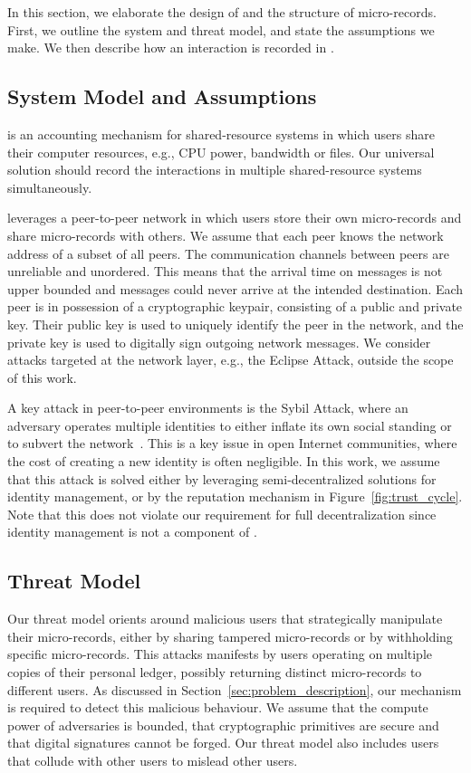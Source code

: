 In this section, we elaborate the design of \ModelName{} and the structure of micro-records.
First, we outline the system and threat model, and state the assumptions we make.
We then describe how an interaction is recorded in \ModelName{}.

\subsection{System Model and Assumptions}
\ModelName{} is an accounting mechanism for shared-resource systems in which users share their computer resources, e.g., CPU power, bandwidth or files.
Our universal solution should record the interactions in multiple shared-resource systems simultaneously.

\ModelName{} leverages a peer-to-peer network in which users store their own micro-records and share micro-records with others.
We assume that each peer knows the network address of a subset of all peers.
The communication channels between peers are unreliable and unordered.
This means that the arrival time on messages is not upper bounded and messages could never arrive at the intended destination.
Each peer is in possession of a cryptographic keypair, consisting of a public and private key.
Their public key is used to uniquely identify the peer in the network, and the private key is used to digitally sign outgoing network messages.
We consider attacks targeted at the network layer, e.g., the Eclipse Attack, outside the scope of this work.

A key attack in peer-to-peer environments is the Sybil Attack, where an adversary operates multiple identities to either inflate its own social standing or to subvert the network~\cite{douceur2002sybil}.
This is a key issue in open Internet communities, where the cost of creating a new identity is often negligible.
In this work, we assume that this attack is solved either by leveraging semi-decentralized solutions for identity management, or by the reputation mechanism in Figure~\ref{fig:trust_cycle}.
Note that this does not violate our requirement for full decentralization since identity management is not a component of \ModelName{}.

\subsection{Threat Model}
\label{sec:threat_model}
Our threat model orients around malicious users that strategically manipulate their micro-records, either by sharing tampered micro-records or by withholding specific micro-records.
This attacks manifests by users operating on multiple copies of their personal ledger, possibly returning distinct micro-records to different users.
As discussed in Section~\ref{sec:problem_description}, our mechanism is required to detect this malicious behaviour.
We assume that the compute power of adversaries is bounded, that cryptographic primitives are secure and that digital signatures cannot be forged.
Our threat model also includes users that collude with other users to mislead other users.

